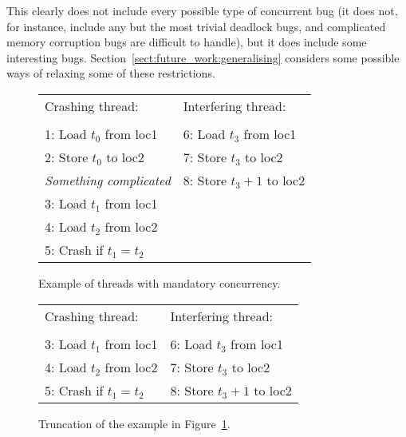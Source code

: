 This clearly does not include every possible type of concurrent bug
(it does not, for instance, include any but the most trivial deadlock
bugs, and complicated memory corruption bugs are difficult to handle),
but it does include some interesting bugs.
Section~\ref{sect:future_work:generalising} considers some possible
ways of relaxing some of these restrictions.

\begin{figure}
\begin{centering}
\hfill
\begin{tabular}{p{8cm}l}
Crashing thread:\hfill         & Interfering thread: \\
\\
1: Load $t_0$ from loc1        & 6: Load $t_3$ from loc1 \\
2: Store $t_0$ to loc2         & 7: Store $t_3$ to loc2 \\
\textit{Something complicated} & 8: Store $t_3 + 1$ to loc2 \\
3: Load $t_1$ from loc1        & \\
4: Load $t_2$ from loc2        & \\
5: Crash if $t_1 = t_2$ & \\
\end{tabular}
\hfill
\end{centering}
\caption{Example of threads with mandatory concurrency.}
\label{fig:mandatory_concurrency1}
\end{figure}

\begin{figure}
\begin{centering}
\hfill
\begin{tabular}{p{8cm}l}
Crashing thread:          & Interfering thread: \\
\\
3: Load $t_1$ from loc1   & 6: Load $t_3$ from loc1 \\
4: Load $t_2$ from loc2   & 7: Store $t_3$ to loc2 \\
5: Crash if $t_1 = t_2$   & 8: Store $t_3 + 1$ to loc2
\end{tabular}
\hfill
\end{centering}
\caption{Truncation of the example in Figure~\ref{fig:mandatory_concurrency1}.}
\label{fig:mandatory_concurrency2}
\end{figure}



